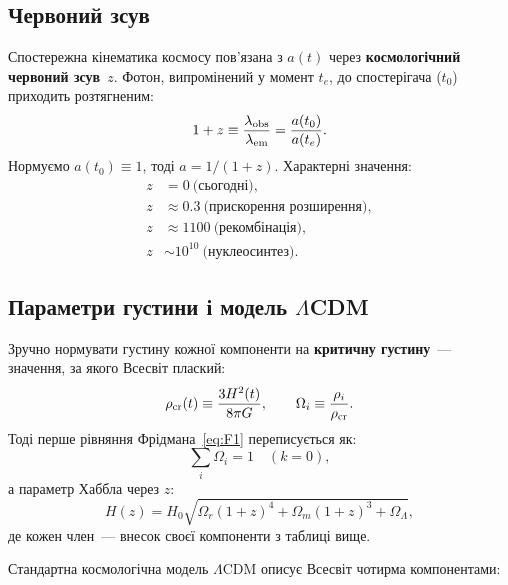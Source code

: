 \documentclass[12pt, a4paper]{article}
\begin{document}
\subsection*{Червоний зсув}

Спостережна кінематика космосу пов'язана з $a(t)$ через
\textbf{космологічний червоний зсув}~$z$. Фотон, випромінений
у момент $t_e$, до спостерігача ($t_0$) приходить розтягненим:
\begin{equation}\label{eq:redshift}
  1 + z \equiv \frac{\lambda_{\rm obs}}{\lambda_{\rm em}}
             = \frac{a(t_0)}{a(t_e)}.
\end{equation}
Нормуємо $a(t_0) \equiv 1$, тоді $a = 1/(1+z)$.
Характерні значення:
\begin{align*}
  z &= 0\ \text{(сьогодні)}, \\
  z &\approx 0.3\ \text{(прискорення розширення)}, \\
  z &\approx 1100\ \text{(рекомбінація)}, \\
  z &\sim 10^{10}\ \text{(нуклеосинтез)}.
\end{align*}

\subsection*{Параметри густини і модель $\Lambda$CDM}

Зручно нормувати густину кожної компоненти на
\textbf{критичну густину}~--- значення, за якого Всесвіт плаский:
\begin{equation}\label{eq:rho_crit}
  \rho_{\rm cr}(t) \equiv \frac{3H^2(t)}{8\pi G},
  \qquad
  \Omega_i \equiv \frac{\rho_i}{\rho_{\rm cr}}.
\end{equation}
Тоді перше рівняння Фрідмана~\eqref{eq:F1} переписується як:
\[
  \sum_i \Omega_i = 1 \quad (k=0),
\]
а параметр Хаббла через $z$:
\begin{equation}\label{eq:Hz}
  H(z) = H_0\sqrt{\Omega_r(1+z)^4 + \Omega_m(1+z)^3 + \Omega_\Lambda},
\end{equation}
де кожен член~--- внесок своєї компоненти з таблиці вище.

Стандартна космологічна модель $\Lambda$CDM описує Всесвіт
чотирма компонентами:
\end{document}
